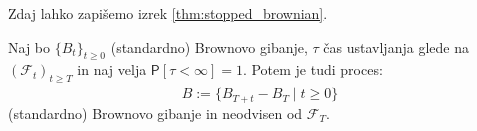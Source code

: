 \documentclass[11pt]{article}
\newcommand{\f}{\mathcal{F}}
\begin{document}
    Zdaj lahko zapišemo izrek \eqref{thm:stopped_brownian}. %
    
    \begin{izrek}
        \label{thm:stopped_brownian}
    Naj bo $\{B_t\}_{t \geq 0}$ (standardno) Brownovo gibanje, $\tau$ čas ustavljanja glede na 
    $(\f_t)_{t \geq T}$ in naj velja $\mathsf{P} [\tau < \infty]=1$.
    Potem je tudi proces:
    \[
    \hat{B} := \{B_{T+t} - B_T \mid t \geq 0\}
    \]
    (standardno) Brownovo gibanje in neodvisen od $\f_T$.
    \end{izrek}
  
    
    
\end{document}
